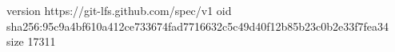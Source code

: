 version https://git-lfs.github.com/spec/v1
oid sha256:95c9a4bf610a412ce733674fad7716632c5c49d40f12b85b23c0b2e33f7fea34
size 17311
